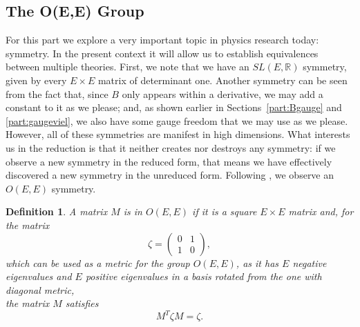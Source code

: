 \documentclass{article}
\newtheorem{definition}{Definition}
\begin{document}
\subsection{The O(E,E) Group}
For this part we explore a very important topic in physics research today: symmetry. In the present context it will allow us to establish equivalences between multiple theories. 
First, we note that we have an $SL(E,\mathbb{R})$ symmetry, given by every $E\times E$ matrix of determinant one. Another symmetry can be seen from the fact that,
since $B$ only appears within a derivative, we may add a constant to it as we please; and, as shown earlier in Sections~\ref{part:Bgauge} and \ref{part:gaugeviel}, we also have some gauge freedom that we may use as we please.
However, all of these symmetries are manifest in high dimensions. What interests us in the reduction is that it neither creates nor destroys any symmetry: if we observe a new symmetry in the reduced form, that means we have effectively discovered a new symmetry in the unreduced form.
Following \cite{maharana1993noncompact}, we observe an $O(E,E)$ symmetry.
\begin{definition}
    A matrix $M$ is in $O(E,E)$ if it is a square $E\times E$ matrix and, for the matrix
    \begin{equation*}
        \zeta = \begin{pmatrix}
            0 & 1 \\ 1 &0
        \end{pmatrix},
    \end{equation*}
    which can be used as a metric for the group $O(E,E)$, as it has $E$ negative eigenvalues and $E$ positive eigenvalues in a basis rotated from the one with diagonal metric,\\ 
    the matrix $M$ satisfies
    \begin{equation*}
        \boxed{M^T \zeta M = \zeta. }
    \end{equation*}
\end{definition}
\end{document}
